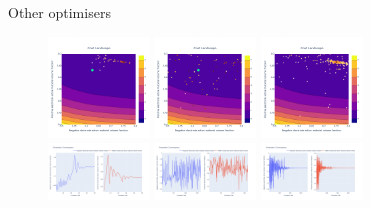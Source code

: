 \documentclass[aspectratio=169]{beamer}
\begin{document}
\begin{frame}{Other optimisers}
    \vspace{-6mm}
    \begin{figure}
        \centering
        \includegraphics[width=0.24\textwidth]{Images/Optimisers/neldermead_cost.png}
        \includegraphics[width=0.24\textwidth]{Images/Optimisers/pso_cost.png}
        \includegraphics[width=0.24\textwidth]{Images/Optimisers/scipyde_cost.png} ~~~~\\
        \includegraphics[width=0.24\textwidth]{Images/Optimisers/neldermead_params.png}
        \includegraphics[width=0.24\textwidth]{Images/Optimisers/pso_params.png}
        \includegraphics[width=0.24\textwidth]{Images/Optimisers/scipyde_params.png}
        \label{fig:optimisers2}
    \end{figure}
\end{frame}
\end{document}
